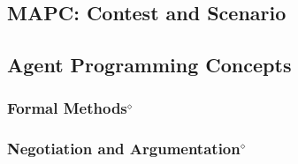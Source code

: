 \subsection[MAPC: Contest and Scenario]{MAPC: Contest and Scenario}


\subsection{Agent Programming Concepts}



\subsubsection[Formal Methods]{Formal Methods$^\diamond$}\label{fun:formal_methods}


\subsubsection[Negotiation and Argumentation]{Negotiation and Argumentation$^\diamond$}\label{fun:negotiation}


